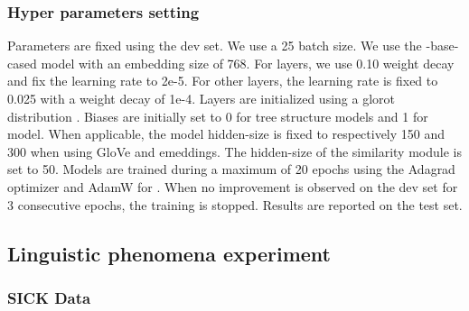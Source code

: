 \subsubsection{Hyper parameters setting}

Parameters are fixed using the dev set. We use a 25 batch size. We use the \bert-base-cased model \parencite{wolf_19} with an embedding size of 768. For \bert layers, we use 0.10 weight decay and fix the learning rate to 2e-5. For other layers, the learning rate is fixed to 0.025 with a weight decay of 1e-4. Layers are initialized using a glorot distribution \parencite{glorot_10} . Biases are initially set to 0 for tree structure models and 1 for \seq model. When applicable, the model hidden-size is fixed to respectively 150 and 300 when using GloVe and \bert emeddings. The hidden-size of the similarity module is set to 50. Models are trained during a maximum of 20 epochs using the Adagrad optimizer \parencite{duchi_11} and AdamW for \bert \parencite{loshchilov_19}. When no improvement is observed on the dev set for 3 consecutive epochs, the training is stopped. Results are reported on the test set. 
% 
\subsection{Linguistic phenomena experiment}
\label{sec:linguistic-breakdown}


\subsubsection{SICK Data} 

